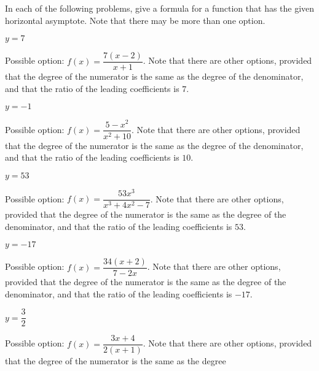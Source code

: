 \begin{exercises}
\begin{problem}
In each of the following problems, give a formula for a function that
has the given horizontal asymptote. Note that there may be more than one option.
\begin{multicols}{4}
	\begin{subproblem}
		$y=7$
		\begin{shortsolution}
			Possible option: $f(x)=\dfrac{7(x-2)}{x+1}$. Note that there
			are other options, provided that the degree of the numerator is the same as the degree
			of the denominator, and that the ratio of the leading
			coefficients is $7$.
		\end{shortsolution}
	\end{subproblem}
	\begin{subproblem}
		$y=-1$
		\begin{shortsolution}
			Possible option: $f(x)=\dfrac{5-x^2}{x^2+10}$. Note that there
			are other options, provided that the degree of the numerator is the same as the degree
			of the denominator, and that the ratio of the leading
			coefficients is $10$.
		\end{shortsolution}
	\end{subproblem}
	\begin{subproblem}
		$y=53$
		\begin{shortsolution}
			Possible option: $f(x)=\dfrac{53x^3}{x^3+4x^2-7}$. Note that there
			are other options, provided that the degree of the numerator is the same as the degree
			of the denominator, and that the ratio of the leading
			coefficients is $53$.
		\end{shortsolution}
	\end{subproblem}
	\begin{subproblem}
		$y=-17$
		\begin{shortsolution}
			Possible option: $f(x)=\dfrac{34(x+2)}{7-2x}$. Note that there
			are other options, provided that the degree of the numerator is the same as the degree
			of the denominator, and that the ratio of the leading
			coefficients is $-17$.
		\end{shortsolution}
	\end{subproblem}
	\begin{subproblem}
		$y=\dfrac{3}{2}$
		\begin{shortsolution}
			Possible option: $f(x)=\dfrac{3x+4}{2(x+1)}$. Note that there
			are other options, provided that the degree of the numerator is the same as the degree

\end{shortsolution}
\end{subproblem}
\end{multicols}
\end{problem}
\end{exercises}

